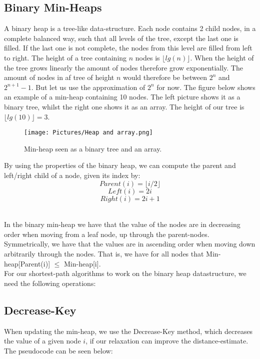 \documentclass[11pt]{article}
\begin{document}
\subsection{Binary Min-Heaps}
A binary heap is a tree-like data-structure. Each node contains 2 child nodes, in a complete balanced way, such that all levels of the tree, except the last one is filled. If the last one is not complete, the nodes from this level are filled from left to right. The height of a tree containing $n$ nodes is $\lfloor lg(n) \rfloor$. When the height of the tree grows linearly the amount of nodes therefore grow exponentially. The amount of nodes in af tree of height $n$ would therefore be between $2^n$ and $2^{n+1}-1$. But let us use the approximation of $2^n$ for now. The figure below shows an example of a min-heap containing 10 nodes. The left picture shows it as a binary tree, whilst the right one shows it as an array. The height of our tree is $\lfloor lg(10) \rfloor = 3$.

\begin{figure}[H]
\centering
\texttt{[image: Pictures/Heap and array.png]}
\caption{Min-heap seen as a binary tree and an array.}
\end{figure}

\noindent By using the properties of the binary heap, we can compute the parent and left/right child of a node, given its index by:\\
$$Parent(i) = \lfloor i/2 \rfloor$$
$$Left(i) = 2i$$
$$Right(i) = 2i+1$$

\ \\In the binary min-heap we have that the value of the nodes are in decreasing order when moving from a leaf node, up through the parent-nodes. Symmetrically, we have that the values are in ascending order when moving down arbitrarily through the nodes. That is, we have for all nodes that Min-heap[Parent(i)] $\leq$ Min-heap[i].\\

\noindent For our shortest-path algorithms to work on the binary heap datastructure, we need the following operations:

\newpage
\subsection{Decrease-Key}
When updating the min-heap, we use the Decrease-Key method, which decreases the value of a given node $i$, if our relaxation can improve the distance-estimate. The pseudocode can be seen below:\\
\end{document}
